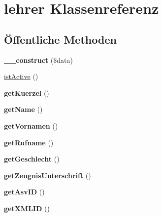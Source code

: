 \hypertarget{classlehrer}{}\section{lehrer Klassenreferenz}
\label{classlehrer}
\subsection*{Öffentliche Methoden}
\begin{DoxyCompactItemize}
\item 
\mbox{\label{classlehrer_a6851cb5b5e0e8dc5e7c4b5c08b253551}} 
{\bfseries \+\_\+\+\_\+construct} (\$data)
\item 
\mbox{\hyperlink{classlehrer_a0afbb6b4e1917566563f415eaafacd32}{ist\+Active}} ()
\item 
\mbox{\label{classlehrer_a9a17ebf045f64d700e3d9f4f8f94295b}} 
{\bfseries get\+Kuerzel} ()
\item 
\mbox{\label{classlehrer_a22f807cd6c82941d3ab0ef14273cf630}} 
{\bfseries get\+Name} ()
\item 
\mbox{\label{classlehrer_a515f62ea22d382ca0dc65d64ffbae8fc}} 
{\bfseries get\+Vornamen} ()
\item 
\mbox{\label{classlehrer_a6f817f798ca801e38e7009b257fba61c}} 
{\bfseries get\+Rufname} ()
\item 
\mbox{\label{classlehrer_ac3eabd1cb7cf72e5cf99a1b1fcd0a0e3}} 
{\bfseries get\+Geschlecht} ()
\item 
\mbox{\label{classlehrer_a6011072346a25d687db069b212521ee5}} 
{\bfseries get\+Zeugnis\+Unterschrift} ()
\item 
\mbox{\label{classlehrer_aad6ad089f3378487f1854288fa73a432}} 
{\bfseries get\+Asv\+ID} ()
\item 
\mbox{\label{classlehrer_ae6733b4f4d2a820f9e837329284cb039}} 
{\bfseries get\+X\+M\+L\+ID} ()
\item 
\mbox{\label{classlehrer_a3b45d9939251a4556d1c8bebd58f4a21}} 

\end{DoxyCompactItemize}
